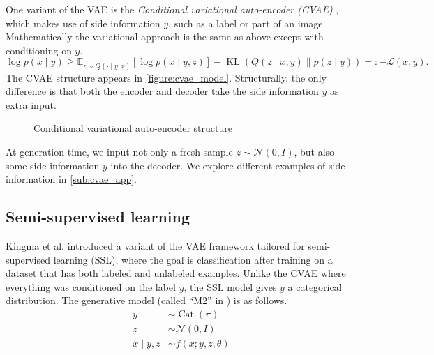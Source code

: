 \documentclass[10pt]{article}
\newcommand{\op}[1]{\operatorname{#1}}
\newcommand{\E}{\mathbb{E}}
\begin{document}
One variant of the VAE is the \emph{Conditional variational auto-encoder (CVAE)} \cite{sohn2015learning}, which makes use of side information $y$, such as a label or part of an image. Mathematically the variational approach is the same as above except with conditioning on $y$.
\begin{equation}
\log p(x \mid y)
\ge \E_{z \sim Q(\cdot \mid y,x)}[\log p(x \mid y,z)]
- \op{KL}(Q(z \mid x,y) \| p(z \mid y))=: -\mathcal{L}(x,y).
\end{equation}
The CVAE structure appears in \autoref{figure:cvae_model}. Structurally, the only difference is that both the encoder and decoder take the side information $y$ as extra input.

\begin{figure}[!ht]
\centering
{}
\caption{Conditional variational auto-encoder structure}
\label{figure:cvae_model}
\end{figure}

At generation time, we input not only a fresh sample $z \sim \mathcal{N}(0,I)$, but also some side information $y$ into the decoder. We explore different examples of side information in \autoref{sub:cvae_app}.
\subsection{Semi-supervised learning}
Kingma et al. \cite{DBLP:journals/corr/KingmaRMW14} introduced a variant of the VAE framework tailored for semi-supervised learning (SSL), where the goal is classification after training on a dataset that has both labeled and unlabeled examples. Unlike the CVAE where everything was conditioned on the label $y$, the SSL model gives $y$ a categorical distribution. The generative model (called ``M2'' in \cite{DBLP:journals/corr/KingmaRMW14}) is as follows.
\begin{align}
y &\sim \op{Cat}(\pi)\\
z &\sim \mathcal{N}(0,I)\\
x \mid y,z &\sim f(x; y,z,\theta)
\end{align}
\end{document}

